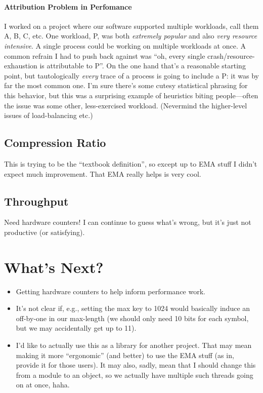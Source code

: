 \documentclass{scrartcl}
\begin{document}
\paragraph{Attribution Problem in Perfomance}
I worked on a project where our software supported multiple workloads, call them A, B, C, etc.
One workload, P, was both \emph{extremely popular} and also \emph{very resource intensive}.
A single process could be working on multiple workloads at once.
A common refrain I had to push back against was ``oh, every single crash/resource-exhaustion is attributable to P''.
On the one hand that's a reasonable starting point, but tautologically \emph{every} trace of a process is going to include a P: it was by far the most common one.
I'm sure there's some cutesy statistical phrasing for this behavior, but this was a surprising example of heuristics biting people---often the issue was some other, less-exercised workload.
(Nevermind the higher-level issues of load-balancing etc.)
\subsection{Compression Ratio}
This is trying to be the ``textbook definition'', so except up to EMA stuff I didn't expect much improvement.
That EMA really helps is very cool.
\subsection{Throughput}
Need hardware counters! I can continue to guess what's wrong, but it's just not productive (or satisfying).
\section{What's Next?}
\begin{itemize}
    \item Getting hardware counters to help inform performance work.
    \item It's not clear if, e.g., setting the max key to 1024 would basically induce an off-by-one in our max-length (we should only need 10 bits for each symbol, but we may accidentally get up to 11).
    \item I'd like to actually use this as a library for another project.
    That may mean making it more ``ergonomic'' (and better) to use the EMA stuff (as in, provide it for those users).
    It may also, sadly, mean that I should change this from a module to an object, so we actually have multiple such threads going on at once, haha.
\end{itemize}
\end{document}
